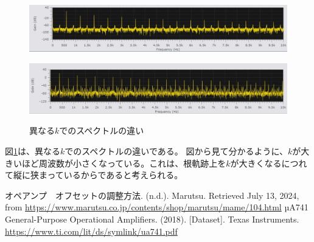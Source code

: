 \documentclass[a4paper]{ltjsarticle}
\begin{document}
\begin{figure}[htbp]
    \centering
        \begin{minipage}{0.48\columnwidth}
            \centering
            \includegraphics[width=0.95\columnwidth]{./images/wienbridge_spec_shallow.jpg}
            \label{fig:wienbridge_spec_shallow}
        \end{minipage}
        \begin{minipage}{0.48\columnwidth}
            \centering
            \includegraphics[width=0.95\columnwidth]{./images/wienbridge_spec_deep.jpg}
            \label{fig:wienbridge_spec_deep}
        \end{minipage}
    \caption{異なる$k$でのスペクトルの違い}
    \label{fig:wienbridge_spec}
\end{figure}
図\ref{fig:wienbridge_spec}は、異なる$k$でのスペクトルの違いである。
図から見て分かるように、$k$が大きいほど周波数が小さくなっている。これは、根軌跡上を$k$が大きくなるにつれて縦に狭まっているからであると考えられる。


\begin{thebibliography}{99}
     オペアンプ　オフセットの調整方法. (n.d.). Marutsu. Retrieved July 13, 2024, from \url{https://www.marutsu.co.jp/contents/shop/marutsu/mame/104.html}
     µA741 General-Purpose Operational Amplifiers. (2018). [Dataset]. Texas Instruments. \url{https://www.ti.com/lit/ds/symlink/ua741.pdf}
\end{thebibliography}
\end{document}
